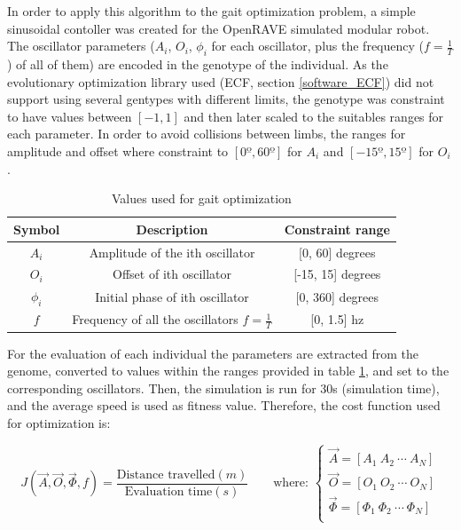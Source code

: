 In order to apply this algorithm to the gait optimization problem, a simple sinusoidal contoller was created for the OpenRAVE simulated modular robot. The oscillator parameters ($A_i$, $O_i$, $\phi_i$  for each oscillator, plus the frequency ($f= \frac{1}{T}$) of all of them) are encoded in the genotype of the individual. As the evolutionary optimization library used (ECF, section \ref{software_ECF}) did not support using several gentypes with different limits, the genotype was constraint to have values between $[-1, 1]$ and then later scaled to the suitables ranges for each parameter. In order to avoid collisions between limbs, the ranges for amplitude and offset where constraint to $[0º, 60º]$ for $A_i$ and $[-15º, 15º]$ for $O_i$.\\

\begin{table}[h]
\centering
\begin{tabular}{|c||c|c|} \hline
Symbol & Description & Constraint range \\ \hline \hline
$A_i$ & Amplitude of the ith oscillator & [0, 60] degrees \\ \hline
$O_i$ & Offset of ith oscillator & [-15, 15] degrees \\ \hline
$\phi_i$ & Initial phase of ith oscillator & [0, 360] degrees \\ \hline
$f$ & Frequency of all the oscillators $ f=\frac{1}{T}$ &  [0, 1.5] hz \\ \hline

\end{tabular}
\caption{Values used for gait optimization}
\label{tab:osc_constraints}
\end{table}


For the evaluation of each individual the parameters are extracted from the genome, converted to values within the ranges provided in table \ref{tab:osc_constraints}, and set to the corresponding oscillators. Then, the simulation is run for 30s (simulation time), and the average speed is used as fitness value. Therefore, the cost function used for optimization is:

\begin{equation} \label{eq:cost_function}
J( \vec{A}, \vec{O}, \vec{\Phi}, f) = \frac{\text{Distance travelled}(m)}{\text{Evaluation time}(s)} \qquad \text{where: } 
	\begin{cases}
	\vec{A} = [ A_1 ~ A_2 ~ \cdots ~ A_N] \\
	\vec{O} = [ O_1 ~ O_2 ~ \cdots ~ O_N] \\
	\vec{\Phi} = [ \Phi_1 ~ \Phi_2 ~ \cdots ~ \Phi_N] \\
	\end{cases}
\end{equation}\\


